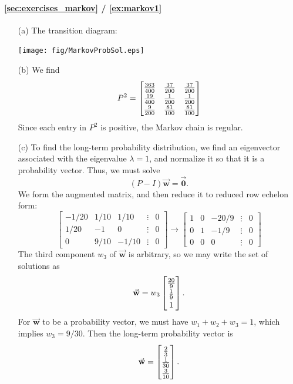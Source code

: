 \documentclass[reqno]{immbook}
\newcommand{\BW}{\vec{\textbf{w}}}
\newcommand{\BZ}{\vec{\textbf{0}}}  %
\newcommand{\T}{\rule{0pt}{2.6ex}}
\newcommand{\B}{\rule[-1.2ex]{0pt}{0pt}}
\begin{document}
\paragraph{\ref{sec:exercises_markov} / \ref{ex:markov1}}
\begin{enumerate}
\item[(a)] The transition diagram:

\medskip
\centerline{%
\texttt{[image: fig/MarkovProbSol.eps]}
}
\medskip

\item[(b)]
We find
\[
  P ^2= \begin{bmatrix}
           \frac{363}{400} & \frac{37}{200} & \frac{37}{200} \T\B \\
	   \frac{19}{400} & \frac{1}{200}   & \frac{1}{200} \B  \\
	   \frac{9}{200}    & \frac{81}{100} & \frac{81}{100} \B
      \end{bmatrix}
\]
Since each entry in $P^2$ is positive, the Markov chain is regular.
\item[(c)]
To find the long-term probability distribution, we find an eigenvector
associated with the eigenvalue $\lambda=1$, and normalize it so that
it is a probability vector.
Thus, we must solve
\[
  (P-I)\BW = \BZ.
\]
We form the augmented matrix,
and then reduce it to reduced row echelon form:
\[
\begin{bmatrix}
   -1/20 & 1/10 & 1/10 & \vdots & 0 \\
   1/20  &   -1  &  0   & \vdots & 0 \\
   0     &  9/10 & -1/10 & \vdots & 0
\end{bmatrix}
\rightarrow
\begin{bmatrix}
   1  &   0  & -20/9  & \vdots & 0 \\
   0  &   1  & -1/9   & \vdots & 0 \\
   0  &   0  &  0     & \vdots & 0
\end{bmatrix}
\]
The third component $w_3$ of $\BW$ is arbitrary, so we may write
the set of solutions as
\[
   \BW = w_3 \begin{bmatrix}
               \frac{20}{9} \T\B \\ \frac{1}{9} \B\\ 1
             \end{bmatrix} .
\]
For $\BW$ to be a probability vector, we must have $w_1+w_2+w_3=1$,
which implies $w_3 = 9/30$.  Then the long-term probability vector
is
\[
  \BW = \begin{bmatrix}
          \frac{2}{3} \T\B \\ \frac{1}{30} \B \\ \frac{3}{10} \B
        \end{bmatrix} .
\]
\end{enumerate}
\end{document}
